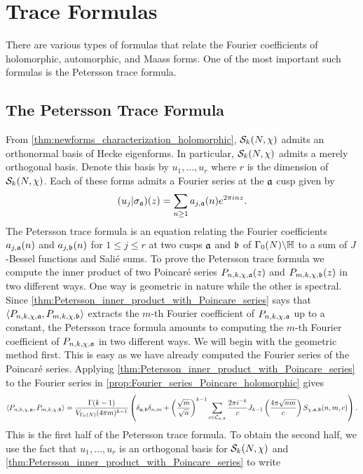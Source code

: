 \chapter{Trace Formulas}
  There are various types of formulas that relate the Fourier coefficients of holomorphic, automorphic, and Maass forms. One of the most important such formulas is the Petersson trace formula.
  \section{The Petersson Trace Formula}
    From \cref{thm:newforms_characterization_holomorphic}, $\mathcal{S}_{k}(N,\chi)$ admits an orthonormal basis of Hecke eigenforms. In particular, $\mathcal{S}_{k}(N,\chi)$ admits a merely orthogonal basis. Denote this basis by $u_{1},\ldots,u_{r}$ where $r$ is the dimension of $\mathcal{S}_{k}(N,\chi)$. Each of these forms admits a Fourier series at the $\mathfrak{a}$ cusp given by
    \[
      (u_{j}|\sigma_{\mathfrak{a}})(z) = \sum_{n \ge 1}a_{j,\mathfrak{a}}(n)e^{2\pi inz}.
    \]
    The Petersson trace formula is an equation relating the Fourier coefficients $a_{j,\mathfrak{a}}(n)$ and $a_{j,\mathfrak{b}}(n)$ for $1 \le j \le r$ at two cusps $\mathfrak{a}$ and $\mathfrak{b}$ of $\Gamma_{0}(N)\backslash\mathbb{H}$ to a sum of $J$-Bessel functions and Sali\'e sums. To prove the Petersson trace formula we compute the inner product of two Poincar\'e series $P_{n,k,\chi,\mathfrak{a}}(z)$ and $P_{m,k,\chi,\mathfrak{b}}(z)$ in two different ways. One way is geometric in nature while the other is spectral. Since \cref{thm:Petersson_inner_product_with_Poincare_series} says that $\langle P_{n,k,\chi,\mathfrak{a}},P_{m,k,\chi,\mathfrak{b}}\rangle$ extracts the $m$-th Fourier coefficient of $P_{n,k,\chi,\mathfrak{a}}$ up to a constant, the Petersson trace formula amounts to computing the $m$-th Fourier coefficient of $P_{n,k,\chi,\mathfrak{a}}$ in two different ways. We will begin with the geometric method first. This is easy as we have already computed the Fourier series of the Poincar\'e series. Applying \cref{thm:Petersson_inner_product_with_Poincare_series} to the Fourier series in \cref{prop:Fourier_series_Poincare_holomorphic} gives
    \[
      \langle P_{n,k,\chi,\mathfrak{a}},P_{m,k,\chi,\mathfrak{b}}\rangle = \frac{\Gamma(k-1)}{V_{\Gamma_{0}(N)}(4\pi m)^{k-1}}\left(\delta_{\mathfrak{a},\mathfrak{b}}\delta_{n,m}+\left(\frac{\sqrt{m}}{\sqrt{n}}\right)^{k-1}\sum_{c \in \mathcal{C}_{\mathfrak{a},\mathfrak{b}}}\frac{2\pi i^{-k}}{c}J_{k-1}\left(\frac{4\pi\sqrt{nm}}{c}\right)S_{\chi,\mathfrak{a},\mathfrak{b}}(n,m,c)\right).
    \]
    This is the first half of the Petersson trace formula. To obtain the second half, we use the fact that $u_{1},\ldots,u_{r}$ is an orthogonal basis for $\mathcal{S}_{k}(N,\chi)$ and \cref{thm:Petersson_inner_product_with_Poincare_series} to write
